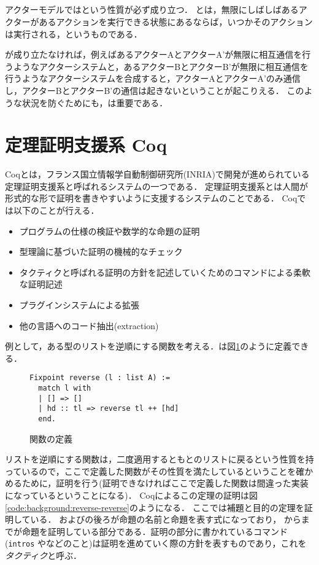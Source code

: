 \subsection{\fairness}

アクターモデルでは\fairness という性質が必ず成り立つ．
\fairness とは，無限にしばしばあるアクターがあるアクションを実行できる状態にあるならば，いつかそのアクションは実行される，というものである．

\fairness が成り立たなければ，例えばあるアクターAとアクターA'が無限に相互通信を行うようなアクターシステムと，あるアクターBとアクターB'が無限に相互通信を行うようなアクターシステムを合成すると，アクターAとアクターA'のみ通信し，アクターBとアクターB'の通信は起きないということが起こりえる．
このような状況を防ぐためにも，\fairness は重要である．


\section{定理証明支援系 Coq}

Coq\cite{Coq}とは，フランス国立情報学自動制御研究所(INRIA)で開発が進められている定理証明支援系と呼ばれるシステムの一つである．
定理証明支援系とは人間が形式的な形で証明を書きやすいように支援するシステムのことである．
Coqでは以下のことが行える．

\begin{itemize}
\item プログラムの仕様の検証や数学的な命題の証明
\item 型理論に基づいた証明の機械的なチェック
\item タクティクと呼ばれる証明の方針を記述していくためのコマンドによる柔軟な証明記述
\item プラグインシステムによる拡張
\item 他の言語へのコード抽出(extraction)
\end{itemize}

例として，ある型のリストを逆順にする関数を考える．は図\ref{code:background:reverse}のように定義できる．

\begin{figure}
\begin{lstlisting}
Fixpoint reverse (l : list A) :=
  match l with
  | [] => []
  | hd :: tl => reverse tl ++ [hd]
  end.
\end{lstlisting}
\caption{関数の定義}\label{code:background:reverse}
\end{figure}

リストを逆順にする関数は，二度適用するともとのリストに戻るという性質を持っているので，ここで定義した関数がその性質を満たしているということを確かめるために，証明を行う(証明できなければここで定義した関数は間違った実装になっているということになる)．
Coqによるこの定理の証明は図\ref{code:background:reverse-reverse}のようになる．
ここでは補題と目的の定理を証明している．
およびの後ろが命題の名前と命題を表す式になっており，
からまでが命題を証明している部分である．証明の部分に書かれているコマンド(\lstinline{intros} やなどのこと)は証明を進めていく際の方針を表すものであり，これを\emph{タクティク}と呼ぶ．

